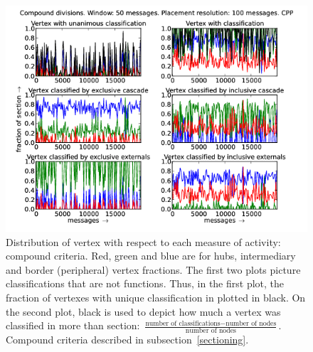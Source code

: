 \documentclass[%
 aip,
 jmp,%
 amsmath,amssymb,
 reprint,%
]{revtex4-1}
\begin{document}
\begin{figure}[hbtp] 
   \centering
        \includegraphics[width=\textwidth]{figs/CPP/50_2}
    \caption{Distribution of vertex with respect to each measure of activity: compound criteria. Red, green and blue are for hubs, intermediary and border (peripheral) vertex fractions. The first two plots picture classifications that are not functions. Thus, in the first plot, the fraction of vertexes with unique classification in plotted in black. On the second plot, black is used to depict how much a vertex was classified in more than section: $\frac{\text{number of classifications} - \text{number of nodes}}{\text{number of nodes}}$. Compound criteria described in subsection~\ref{sectioning}.}
    \label{fig:cpp50_}
\end{figure}
\end{document}
